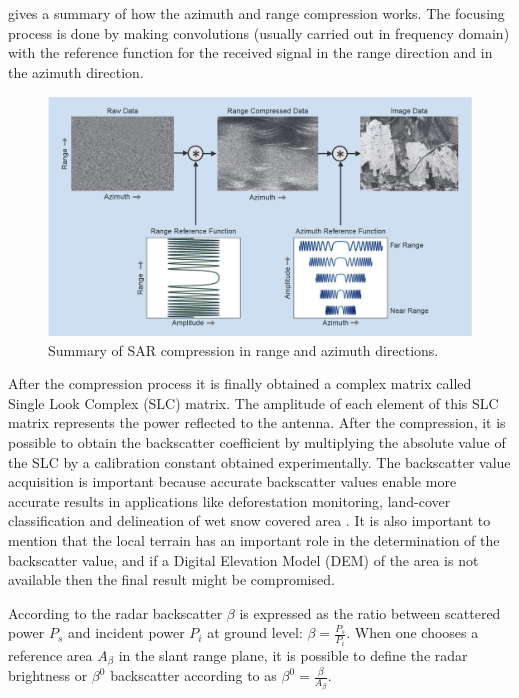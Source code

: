  gives a summary of how the azimuth and range compression works. The focusing process is done by making convolutions (usually carried out in frequency domain) with the reference function for the received signal in the range direction and in the azimuth direction.
\begin{figure}[H]
    \centering
    \includegraphics[width=\linewidth]{Cap1/compres.png}
    \caption{Summary of SAR compression in range and azimuth directions. \cite{tutorial}}
    \label{fig:sar_compression}
\end{figure}

After the compression process it is finally obtained a complex matrix called Single Look Complex (SLC) matrix. The amplitude of each element of this SLC matrix represents the power reflected to the antenna. After the compression, it is possible to obtain the backscatter coefficient by multiplying the absolute value of the SLC by a calibration constant obtained experimentally.
The backscatter value acquisition is important because accurate backscatter values enable more accurate results in applications like deforestation monitoring, land-cover classification and delineation of wet snow covered area \cite{Small}. It is also important to mention that the local terrain has an important role in the determination of the backscatter value, and if a Digital Elevation Model (DEM) of the area is not available then the final result might be compromised.

According to \cite{Small} the radar backscatter $\beta$ is expressed as the ratio between scattered power $P_s$ and incident power $P_i$ at ground level: $\beta = \frac{P_s}{P_i}$. When one chooses a reference area $A_\beta$ in the slant range plane, it is possible to define the radar brightness or  $\beta^0$ backscatter according to \cite{Raney} as $\beta^0 = \frac{\beta}{A_\beta}$.

